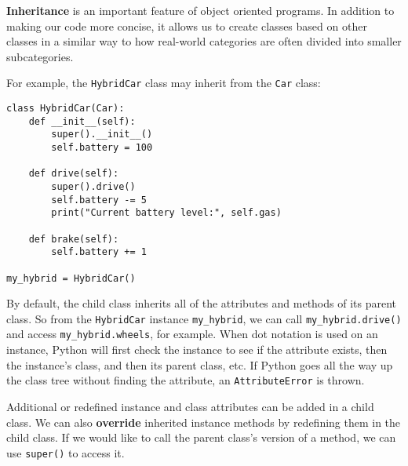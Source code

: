 \textbf{Inheritance} is an important feature of object oriented programs. In addition to making our code more concise, it allows us to create classes based on other classes in a similar way to how real-world categories are often divided into smaller subcategories. 

For example, the \lstinline{HybridCar} class may inherit from the \lstinline{Car} class: 

\begin{lstlisting}
class HybridCar(Car):
    def __init__(self):
        super().__init__()
        self.battery = 100

    def drive(self):
        super().drive()
        self.battery -= 5
        print("Current battery level:", self.gas)

    def brake(self):
        self.battery += 1

my_hybrid = HybridCar()
\end{lstlisting}

By default, the child class inherits all of the attributes and methods of its parent class. So from the \lstinline{HybridCar} instance \lstinline{my_hybrid}, we can call \lstinline{my_hybrid.drive()} and access \lstinline{my_hybrid.wheels}, for example. When dot notation is used on an instance, Python will first check the instance to see if the attribute exists, then the instance's class, and then its parent class, etc. If Python goes all the way up the class tree without finding the attribute, an \lstinline{AttributeError} is thrown. 

Additional or redefined instance and class attributes can be added in a child class. We can also \textbf{override} inherited instance methods by redefining them in the child class. If we would like to call the parent class's version of a method, we can use \lstinline{super()} to access it. 
